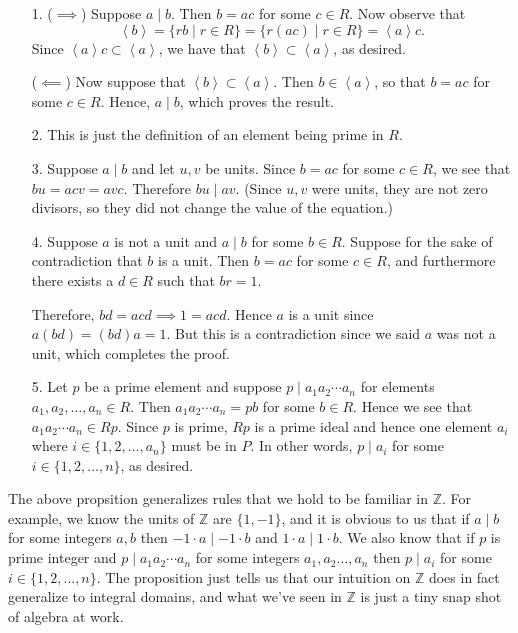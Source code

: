\documentclass[12pt,letterpaper]{algebra_book}
\newcommand{\ZZ}{\mathbb{Z}}
\theoremstyle{definition}
\begin{document}
\begin{prf}
\begin{itemize}
    \item[1.] ($\implies$) Suppose $a \mid b$. Then $b = ac$ for some $c \in
    R$. Now observe that 
    \[
        \left< b \right> = \{rb \mid r \in R\} = \{r(ac) \mid r \in R\} = \left<a\right>c.
    \]
    Since $\left< a \right>c \subset \left< a \right>$, we have
    that $\left< b \right> \subset \left< a \right>$, as desired.
    
    ($\impliedby$) Now suppose that $\left< b \right> \subset
    \left< a \right>$. Then $b \in \left< a \right>$, so that $b =
    ac$ for some $c \in R$. Hence, $a \mid b$, which proves the
    result. 

    \item[2.] This is just the definition of an
    element being prime in $R$. 

    \item[3.] Suppose $a \mid b$ and let $u, v$ be units. Since $b
    = ac$ for some $c\in R$, we see that $bu = acv = avc$.
    Therefore $bu \mid av$. (Since $u, v$ were units, they are not
    zero divisors, so they did not change the value of the
    equation.)

    \item[4.] Suppose $a$ is not a unit and $a \mid b$ for some $b
    \in R$. Suppose for the sake of contradiction that $b$ is a
    unit. Then $b = ac$ for some $c \in R$, and furthermore there
    exists a $d \in R$ such that $br = 1$. 

    Therefore, $bd = acd \implies 1 = acd$. Hence $a$ is a unit
    since $a(bd) = (bd)a= 1$. But this is a contradiction since we
    said $a$ was not a unit, which completes the proof. 

    \item[5.] Let $p$ be a prime element and suppose $p \mid
    a_1a_2 \cdots a_n$ for elements $a_1, a_2, \dots, a_n \in R$. 
    Then $a_1a_2\cdots a_n = pb$ for some $b \in R$. Hence we see
    that $a_1a_2\cdots a_n \in Rp$. Since $p$ is prime, $Rp$ is a
    prime ideal and hence one element $a_i$ where $i \in \{1, 2,
    \dots, a_n\}$ must be in $P$. In other words, $p \mid a_i$ for
    some $i \in \{1, 2, \dots, n\}$, as desired. 
\end{itemize}
\end{prf}

The above propsition generalizes rules that we hold to be familiar
in $\ZZ$. For example, we know the units of $\ZZ$ are $\{1, -1\}$,
and it is obvious to us that if $a \mid b$ for some integers $a,
b$ then $-1\cdot a \mid -1\cdot b$ and $1 \cdot a \mid 1 \cdot b$.
We also know that if $p$ is prime integer and $p \mid a_1a_2\cdots
a_n$ for some integers $a_1, a_2 \dots, a_n$ then $p \mid a_i$ for
some $i \in \{1, 2, \dots, n\}$. The proposition just tells us
that our intuition on $\ZZ$ does in fact generalize to integral
domains, and what we've seen in $\ZZ$ is just a tiny snap shot of
algebra at work.
\end{document}
